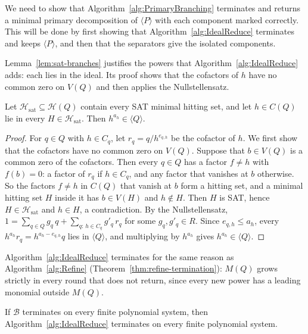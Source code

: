 We need to show that Algorithm~\ref{alg:PrimaryBranching} terminates and
returns a minimal primary decomposition of $\langle P\rangle$ with each
component marked correctly. This will be done by first showing that
Algorithm~\ref{alg:IdealReduce} terminates and keeps $\langle P\rangle$, and
then that the separators give the isolated components.

Lemma~\ref{lem:sat-branches} justifies the powers that
Algorithm~\ref{alg:IdealReduce} adds: each lies in the ideal. Its proof shows
that the cofactors of $h$ have no common zero on $V(Q)$ and then applies the
Nullstellensatz.

\begin{lemma}
  \label{lem:sat-branches}
  Let $\mathcal H_{\mathrm{sat}}\subseteq\mathcal H(Q)$ contain every SAT
  minimal hitting set, and let $h\in C(Q)$ lie in every
  $H\in\mathcal H_{\mathrm{sat}}$. Then $h^{a_h}\in\langle Q\rangle$.
\end{lemma}

\begin{proof}
  For $q\in Q$ with $h\in C_q$, let $r_q=q/h^{e_{q,h}}$ be the cofactor of $h$.
  We first show that the cofactors have no common zero on $V(Q)$. Suppose that
  $b\in V(Q)$ is a common zero of the cofactors. Then every $q\in Q$ has a
  factor $f\neq h$ with $f(b)=0$: a factor of $r_q$ if $h\in C_q$, and any
  factor that vanishes at $b$ otherwise. So the factors $f\neq h$ in $C(Q)$
  that vanish at $b$ form a hitting set, and a minimal hitting set $H$ inside
  it has $b\in V(H)$ and $h\notin H$. Then $H$ is SAT, hence
  $H\in\mathcal H_{\mathrm{sat}}$ and $h\in H$, a contradiction. By the
  Nullstellensatz, $1=\sum_{q\in Q}g_q\,q+\sum_{q:\,h\in C_q}g'_q\,r_q$ for
  some $g_q,g'_q\in R$. Since $e_{q,h}\leq a_h$, every
  $h^{a_h}r_q=h^{a_h-e_{q,h}}q$ lies in $\langle Q\rangle$, and multiplying by
  $h^{a_h}$ gives $h^{a_h}\in\langle Q\rangle$.
\end{proof}

Algorithm~\ref{alg:IdealReduce} terminates for the same reason as
Algorithm~\ref{alg:Refine} (Theorem~\ref{thm:refine-termination}): $M(Q)$
grows strictly in every round that does not return, since every new power has
a leading monomial outside $M(Q)$.

\begin{theorem}
  \label{thm:ideal-reduce-termination}
  If $\mathcal B$ terminates on every finite polynomial system, then
  Algorithm~\ref{alg:IdealReduce} terminates on every finite polynomial system.
\end{theorem}

